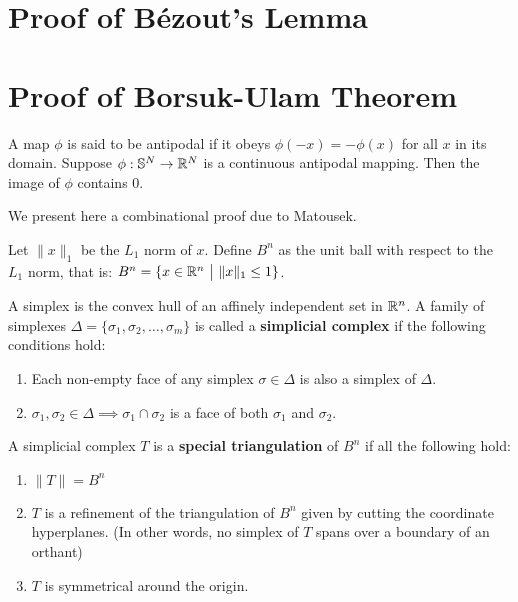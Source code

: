 \chapter{Proof of Bézout's Lemma}
\chapter{Proof of Borsuk-Ulam Theorem}
    \begin{theorem}
        A map $\phi$ is said to be antipodal if it obeys $\phi (-x) = -\phi(x)$ for all $x$ in its domain. Suppose $\phi: \mathbb S^N \to \mathbb R^N$ is a continuous antipodal mapping. 
        Then the image of $\phi$ contains 0. \label{appendix:Borsuk-Ulam}
    \end{theorem}
We present here a combinational proof due to Matousek.\cite{matouvsek2003using} 

Let $\|x\|_1$ be the $L_1$ norm of $x$. Define $B^n$ as the unit ball with respect to the $L_1$ norm, 
that is: $B^n = \{x\in \RR^n \ \big | \ \|x\|_1 \leq 1 \}$.

A simplex is the convex hull of an affinely independent set in $\mathbb R^n$. A family of simplexes $\Delta = \{\sigma_1,\sigma_2, \dots, \sigma_m\}$ is called a \textbf{simplicial complex} if the following conditions hold:
\begin{enumerate}
    \item Each non-empty face of any simplex $\sigma \in \Delta$ is also a simplex of $\Delta$.
    \item $\sigma_1, \sigma_2 \in \Delta \implies \sigma_1 \cap \sigma_2$ is a face of both $\sigma_1$ and $\sigma_2$.
\end{enumerate}
A simplicial complex $T$ is a \textbf{special triangulation} of $B^n$ if all the following hold:
\begin{enumerate}
    \item $\|T\| = B^n$
    \item $T$ is a refinement of the triangulation of $B^n$ given by cutting the coordinate hyperplanes. (In other words, no simplex of $T$ spans over a boundary of an orthant)
    \item $T$ is symmetrical around the origin.
\end{enumerate}

